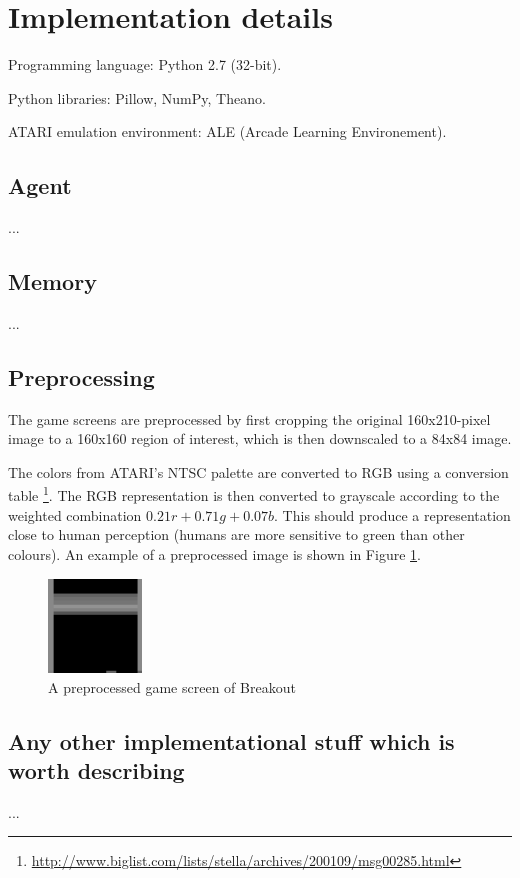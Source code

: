 \documentclass[a4paper,12pt]{article}
\begin{document}
\section{Implementation details}
Programming language: Python 2.7 (32-bit).

Python libraries: Pillow, NumPy, Theano.

ATARI emulation environment: ALE (Arcade Learning Environement).

\subsection{Agent}
...

\subsection{Memory}
...

\subsection{Preprocessing}
\label{subsection_preproc}
The game screens are preprocessed by first cropping the original 160x210-pixel image to a 160x160 region of interest, which is then downscaled to a 84x84 image.

The colors from ATARI's NTSC palette are converted to RGB using a conversion table
\footnote{\url{http://www.biglist.com/lists/stella/archives/200109/msg00285.html}}. The RGB representation is then converted to grayscale according to the weighted combination $0.21r + 0.71g + 0.07b$. This should produce a representation close to human perception (humans are more sensitive to green than other colours). An example of a preprocessed image is shown in Figure \ref{fig:breakoutpreprocessed}.

\begin{figure}[h]
\centering
\includegraphics[width=2.5cm]{fig_preprocessedscreen}
\caption{A preprocessed game screen of Breakout}
\label{fig:breakoutpreprocessed}
\end{figure}



\subsection{Any other implementational stuff which is worth describing}
...
\end{document}

